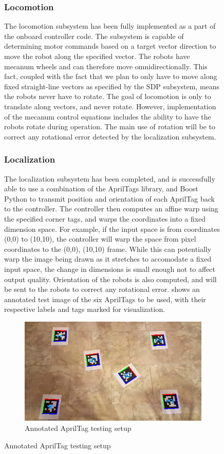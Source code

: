 \begin{figure}[h!]
\subsubsection{Locomotion}
The locomotion subsystem has been fully implemented as a part of the onboard controller code. The subsystem is capable of determining motor commands based on a target vector direction to move the robot along the specified vector. The robots have mecanum wheels and can therefore move omnidirectionally. This fact, coupled with the fact that we plan to only have to move along fixed straight-line vectors as specified by the SDP subsystem, means the robots never have to rotate. The goal of locomotion is only to translate along vectors, and never rotate. However, implementation of the mecanum control equations includes the ability to have the robots rotate during operation. The main use of rotation will be to correct any rotational error detected by the localization subsystem.

\subsubsection{Localization}
The localization subsystem has been completed, and is successfully able to use a combination of the AprilTags library, and Boost Python to transmit position and orientation of each AprilTag back to the controller. The controller then computes an affine warp using the specified corner tags, and warps the coordinates into a fixed dimension space. For example, if the input space is from coordinates (0,0) to (10,10), the controller will warp the space from pixel coordinates to the (0,0), (10,10) frame. While this can potentially warp the image being drawn as it stretches to accomodate a fixed input space, the change in dimensions is small enough not to affect output quality. Orientation of the robots is also computed, and will be sent to the robots to correct any rotational error.  shows an annotated test image of the six AprilTags to be used, with their respective labels and tags marked for visualization.

\begin{figure}[h!]
\centering
\includegraphics[width=0.49\columnwidth]{figs/apriltag_test_annotated.png}
\caption{Annotated AprilTag testing setup}
\label{fig:localization_sample}
\end{figure}


\end{figure}

